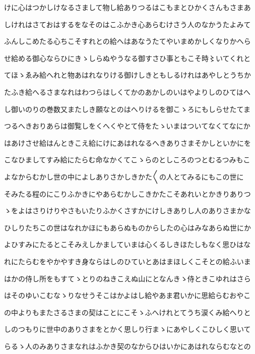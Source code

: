 \documentclass[a4paper,11pt,landscape]{ltjtarticle}
\begin{document}
\par\medskip
けに心はつかしけなるさまして物し給ありつるはこもまとひかくさんもさまあ
\par\medskip
しけれはさておはするをなそのはこふかき心あらむけさう人のなかうたよみて
\par\medskip
ふんしこめたる心ちこそすれとの給へはあなうたてやいまめかしくなりかへら
\par\medskip
せ給める御心ならひにきゝしらぬやうなる御すさひ事ともこそ時〻いてくれと
\par\medskip
てほゝゑみ給へれと物あはれなりける御けしきともしるけれはあやしとうちか
\par\medskip
たふき給へるさまなれはわつらはしくてかのあかしのいはやよりしのひてはへ
\par\medskip
し御いのりの巻数又またしき願なとのはへりけるを御こゝろにもしらせたてま
\par\medskip
つるへきおりあらは御覧しをくへくやとて侍をたゝいまはついてなくてなにか
\par\medskip
はあけさせ給はんときこえ給にけにあはれなるへきありさまそかしといかにを
\par\medskip
こなひましてすみ給にたらむ命なかくてこゝらのとしころのつとむるつみもこ
\par\medskip
よなからむかし世の中によしありさかしきかた〱の人とてみるにもこの世に
\par\medskip
そみたる程のにこりふかきにやあらむかしこきかたこそあれいとかきりありつ
\par\medskip
ゝをよはさりけりやさもいたりふかくさすかにけしきありし人のありさまかな
\par\medskip
ひしりたちこの世はなれかほにもあらぬものからしたの心はみなあらぬ世にか
\par\medskip
よひすみにたるとこそみえしかましていまは心くるしきほたしもなく思ひはな
\par\medskip
れにたらむをやかやすき身ならはしのひていとあはまほしくこそとの給ふいま
\par\medskip
はかの侍し所をもすてゝとりのねきこえぬ山にとなんきゝ侍ときこゆれはさら
\par\medskip
はそのゆいこむなゝりなせうそこはかよはし給やあま君いかに思給らむおやこ
\par\medskip
の中よりもまたさるさまの契はことにこそゝふへけれとてうち涙くみ給へりと
\par\medskip
しのつもりに世中のありさまをとかく思しり行まゝにあやしくこひしく思いて
\par\medskip
らるゝ人のみありさまなれはふかき契のなからひはいかにあはれならむなとの
\end{document}
